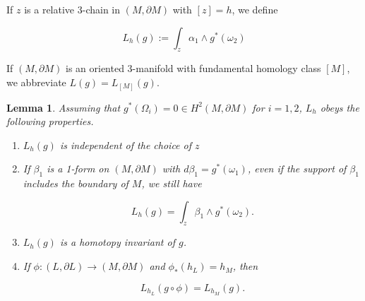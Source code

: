 \documentclass{amsart}
\newtheorem*{theorem 1}{Theorem 1}
\newtheorem*{theorem 2}{Theorem 2}
\newtheorem*{theorem 3}{Theorem 3}
\newtheorem{lemma}{Lemma}[section]
\numberwithin{equation}{section}
\begin{document}
If $z$ is a relative 3-chain in $(M, \partial M)$ with $[z] = h$,  we define

\begin{equation} \label{defL}
L_h(g) := \int_z \alpha_1 \wedge g^*(\omega_2)
\end{equation}

If $(M,  \partial M)$ is an oriented 3-manifold with fundamental homology class $[M]$, we abbreviate $L(g) = L_{[M]}(g)$.  

\begin{lemma} \label{lemmalink} Assuming that $g^*(\Omega_i) = 0 \in H^2(M, \partial M)$ for $i = 1, 2$,  $L_h$ obeys the following properties.

\begin{enumerate}


\item $L_h(g)$ is independent of the choice of $z$

\item If $\beta_1$ is a 1-form on $(M, \partial M)$ with $d \beta_1 = g^*(\omega_1)$,  even if the support of $\beta_1$ includes the boundary of $M$,  we still have

$$ L_h(g) = \int_z \beta_1 \wedge g^*(\omega_2). $$

\item $L_h(g)$ is a homotopy invariant of $g$. 

\item If $\phi: (L, \partial L) \rightarrow (M, \partial M)$ and $\phi_*(h_L) = h_M$,  then

$$ L_{h_L}(g \circ \phi) = L_{h_M} (g).  $$

\end{enumerate}

\end{lemma}
\end{document}
